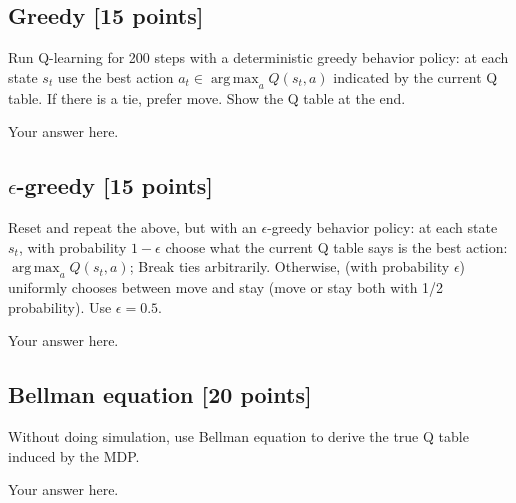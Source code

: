 \documentclass[a4paper]{article}
\theoremstyle{definition}
\DeclareMathOperator*{\argmax}{arg\,max}
\begin{document}
\subsection{Greedy [15 points]}
	Run Q-learning for 200 steps with a deterministic greedy behavior policy: at each state $s_t$ use the best action $a_t \in \argmax_a Q(s_t,a)$ indicated by the current Q table. If there is a tie, prefer move. Show the Q table at the end.
	
	{\color{blue}
		Your answer here.
	}
	
\subsection{$\epsilon$-greedy [15 points]}

Reset and repeat the above, but with an $\epsilon$-greedy behavior policy: at each state $s_t$, with probability $1-\epsilon$ choose what the current Q table says is the best action: $\argmax_a Q(s_t,a)$; Break ties arbitrarily. Otherwise, (with probability $\epsilon$) uniformly chooses between move and stay (move or stay both with 1/2 probability). Use $\epsilon=0.5$.
	
	{\color{blue}
		Your answer here.
	}
	
\subsection{Bellman equation [20 points]}
	
	Without doing simulation, use Bellman equation to derive the true Q table induced by the MDP.
	
	{\color{blue}
		Your answer here.
		
	}
	
\end{document}
